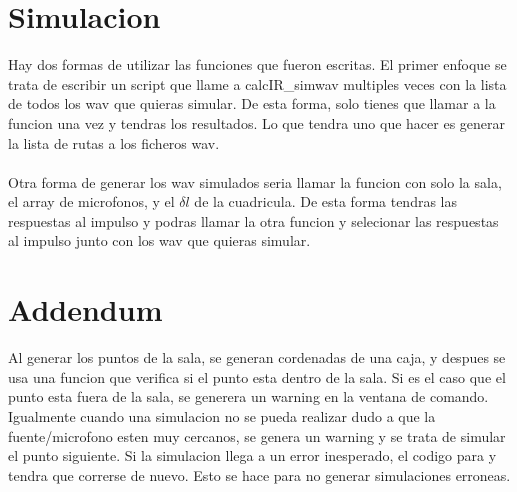 \documentclass{article}
\begin{document}
\section{Simulacion}
Hay dos formas de utilizar las funciones que fueron escritas. El primer enfoque se trata de escribir un script que llame a calcIR\_simwav multiples veces con la lista de todos los wav que quieras simular. De esta forma, solo tienes que llamar a la funcion una vez y tendras los resultados. Lo que tendra uno que hacer es generar la lista de rutas a los ficheros wav.\\\\
Otra forma de generar los wav simulados seria llamar la funcion con solo la sala, el array de microfonos, y el $\delta l$ de la cuadricula. De esta forma tendras las respuestas al impulso y podras llamar la otra funcion y selecionar las respuestas al impulso junto con los wav que quieras simular. 

\section{Addendum}
Al generar los puntos de la sala, se generan cordenadas de una caja, y despues se usa una funcion que verifica si el punto esta dentro de la sala. Si es el caso que el punto esta fuera de la sala, se generera un warning en la ventana de comando. Igualmente cuando una simulacion no se pueda realizar dudo a que la fuente/microfono esten muy cercanos, se genera un warning y se trata de simular el punto siguiente. Si la simulacion llega a un error inesperado, el codigo para y tendra que correrse de nuevo. Esto se hace para no generar simulaciones erroneas.  
\end{document}

